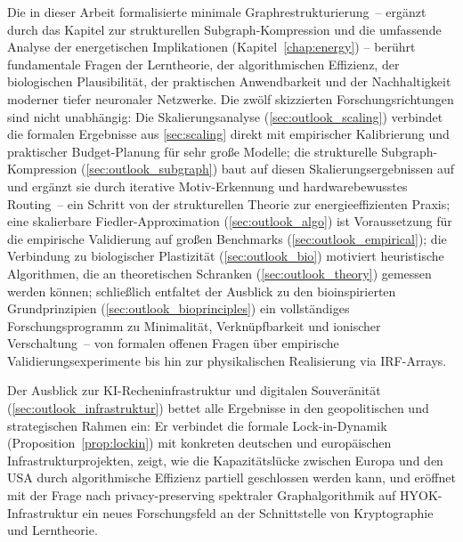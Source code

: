 ﻿\documentclass[12pt, a4paper, openany]{report}
\begin{document}
Die in dieser Arbeit formalisierte minimale Graphrestrukturierung~-- ergänzt
durch das Kapitel zur strukturellen Subgraph-Kompression und die
umfassende Analyse der energetischen Implikationen (Kapitel~\ref{chap:energy})
-- berührt fundamentale Fragen der Lerntheorie, der algorithmischen Effizienz,
der biologischen Plausibilität, der praktischen Anwendbarkeit und der
Nachhaltigkeit moderner tiefer neuronaler Netzwerke.  Die zwölf skizzierten
Forschungsrichtungen sind nicht unabhängig: Die Skalierungsanalyse
(\cref{sec:outlook_scaling}) verbindet die formalen Ergebnisse aus
\cref{sec:scaling} direkt mit empirischer Kalibrierung und praktischer
Budget-Planung für sehr große Modelle; die strukturelle Subgraph-Kompression
(\cref{sec:outlook_subgraph}) baut auf diesen Skalierungsergebnissen auf
und ergänzt sie durch iterative Motiv-Erkennung und hardwarebewusstes
Routing~-- ein Schritt von der strukturellen Theorie zur
energieeffizienten Praxis; eine skalierbare Fiedler-Approximation
(\cref{sec:outlook_algo}) ist Voraussetzung für die empirische Validierung
auf großen Benchmarks (\cref{sec:outlook_empirical}); die Verbindung zu
biologischer Plastizität (\cref{sec:outlook_bio}) motiviert heuristische
Algorithmen, die an theoretischen Schranken (\cref{sec:outlook_theory})
gemessen werden können; schließlich entfaltet der Ausblick zu den
bioinspirierten Grundprinzipien (\cref{sec:outlook_bioprinciples}) ein
vollständiges Forschungsprogramm zu Minimalität, Verknüpfbarkeit und
ionischer Verschaltung~-- von formalen offenen Fragen über empirische
Validierungsexperimente bis hin zur physikalischen Realisierung via IRF-Arrays.

Der Ausblick zur KI-Recheninfrastruktur und digitalen Souveränität
(\cref{sec:outlook_infrastruktur}) bettet alle Ergebnisse in den
geopolitischen und strategischen Rahmen ein: Er verbindet die formale
Lock-in-Dynamik (Proposition~\ref{prop:lockin}) mit konkreten deutschen
und europäischen Infrastrukturprojekten, zeigt, wie die Kapazitätslücke
zwischen Europa und den USA durch algorithmische Effizienz partiell
geschlossen werden kann, und eröffnet mit der Frage nach
privacy-preserving spektraler Graphalgorithmik auf HYOK-Infrastruktur
ein neues Forschungsfeld an der Schnittstelle von Kryptographie und
Lerntheorie.
\end{document}
